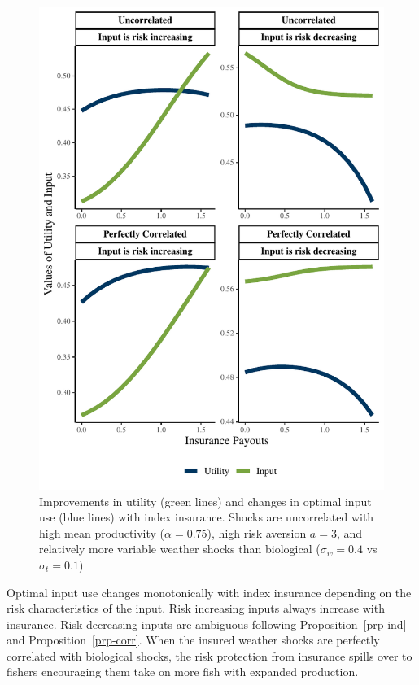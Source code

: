 \documentclass[
  letterpaper,
  DIV=11,
  numbers=noendperiod]{scrartcl}
\theoremstyle{plain}
\theoremstyle{plain}
\theoremstyle{remark}
\begin{document}
\begin{figure}

{\centering \includegraphics{ibi-behavior_files/figure-pdf/fig-iter-1.pdf}

}

\caption{\label{fig-iter}Improvements in utility (green lines) and
changes in optimal input use (blue lines) with index insurance. Shocks
are uncorrelated with high mean productivity (\(\alpha=0.75\)), high
risk aversion \(a=3\), and relatively more variable weather shocks than
biological (\(\sigma_{w}=0.4\) vs \(\sigma_{t}=0.1\))}

\end{figure}

Optimal input use changes monotonically with index insurance depending
on the risk characteristics of the input. Risk increasing inputs always
increase with insurance. Risk decreasing inputs are ambiguous following
Proposition~\ref{prp-ind} and Proposition~\ref{prp-corr}. When the
insured weather shocks are perfectly correlated with biological shocks,
the risk protection from insurance spills over to fishers encouraging
them take on more fish with expanded production.
\end{document}
